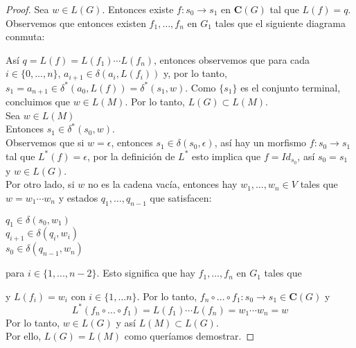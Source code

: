 \documentclass[../main.tex]{subfiles}
\begin{document}
\begin{proof}
 	Sea $w \in L(G)$. Entonces existe $f:s_0 \to s_1$ en $\mathbf{C}(G)$ tal que $L(f)=q$. Observemos que entonces existen $f_1, \dots, f_n$ en $G_1$ tales que el siguiente diagrama conmuta: 
 	\begin{center}
	\end{center}
 	Así $q=L(f)=L(f_1) \cdots L(f_n)$, entonces observemos que para cada $i\in \{0, ..., n\}$, $a_{i+1} \in \delta (a_i, L(f_i))$ y, por lo tanto, $s_1=a_{n+1} \in \delta ^*  (a_0, L(f))=\delta ^*  (s_1, w)$. Como $\{s_1\}$ es el conjunto terminal, concluimos que $w \in L(M)$.  Por lo tanto, $L(G) \subset L(M)$. \\
 	Sea $w \in L(M)$ \\
 	Entonces $s_1 \in \delta ^* (s_0, w)$. \\
 	Observemos que si $w= \epsilon$, entonces $s_1 \in \delta (s_0, \epsilon)$, así hay un morfismo $f:s_0 \to s_1$ tal que $L^*(f)= \epsilon$, por la definición de $L^*$ esto implica que $f=Id_{s_0}$, así $s_0=s_1$ y $w \in L(G)$. \\ 
 	Por otro lado, si $w$ no es la cadena vacía, entonces hay $w_1,\dots, w_n \in V$ tales que $w=w_1 \cdots w_n$ y estados $q_1, \dots, q_{n-1}$ que satisfacen:
 	\begin{multicols}{3}
 		$q_1 \in \delta (s_0,w_1)$ \\
 		$q_{i+1} \in \delta (q_i,w_i)$ \\
 		$s_0 \in \delta (q_{n-1},w_n)$
 	\end{multicols} 
 	para $i \in \{ 1, ..., n-2 \}$. Esto significa que hay $f_1, \dots , f_n$ en $G_1$ tales que
 	
 	 \begin{center}
 	\end{center}
 	y $L(f_i)=w_i$ con $i \in \{1, \dots n\}$. Por lo tanto, $f_n \circ ... \circ f_1 : s_0 \to s_1 \in \mathbf{C}(G)$ y 
 	\[
 		L^*(f_n \circ ... \circ f_1) = L(f_1) \cdots L(f_n)=w_1 \cdots w_n = w
 	\]
 	Por lo tanto, $w \in L(G)$ y así $L(M) \subset L(G)$. \\
 	Por ello, $L(G)=L(M)$ como queríamos demostrar. 
 \end{proof}
 
\end{document}
